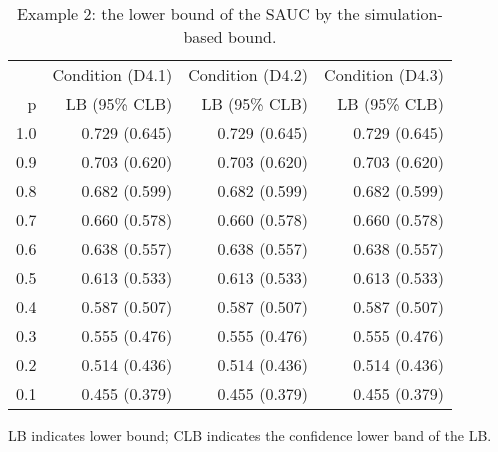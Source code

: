 \begin{table}

\caption{\label{tab:tab2}Example 2: the lower bound of the SAUC by the simulation-based bound.}
\centering
\begin{threeparttable}
\begin{tabular}[t]{rrrr}
\toprule
\multicolumn{1}{c}{} & \multicolumn{1}{c}{Condition (D4.1)} & \multicolumn{1}{c}{Condition (D4.2)} & \multicolumn{1}{c}{Condition (D4.3)} \\
\cmidrule(l{3pt}r{3pt}){2-2} \cmidrule(l{3pt}r{3pt}){3-3} \cmidrule(l{3pt}r{3pt}){4-4}
p & LB (95\% CLB) & LB (95\% CLB) & LB (95\% CLB)\\
\midrule
1.0 & 0.729 (0.645) & 0.729 (0.645) & 0.729 (0.645)\\
0.9 & 0.703 (0.620) & 0.703 (0.620) & 0.703 (0.620)\\
0.8 & 0.682 (0.599) & 0.682 (0.599) & 0.682 (0.599)\\
0.7 & 0.660 (0.578) & 0.660 (0.578) & 0.660 (0.578)\\
0.6 & 0.638 (0.557) & 0.638 (0.557) & 0.638 (0.557)\\
0.5 & 0.613 (0.533) & 0.613 (0.533) & 0.613 (0.533)\\
0.4 & 0.587 (0.507) & 0.587 (0.507) & 0.587 (0.507)\\
0.3 & 0.555 (0.476) & 0.555 (0.476) & 0.555 (0.476)\\
0.2 & 0.514 (0.436) & 0.514 (0.436) & 0.514 (0.436)\\
0.1 & 0.455 (0.379) & 0.455 (0.379) & 0.455 (0.379)\\
\bottomrule
\end{tabular}
\begin{tablenotes}
\item 
           LB indicates lower bound; CLB indicates the confidence lower band of the LB.
\end{tablenotes}
\end{threeparttable}
\end{table}
